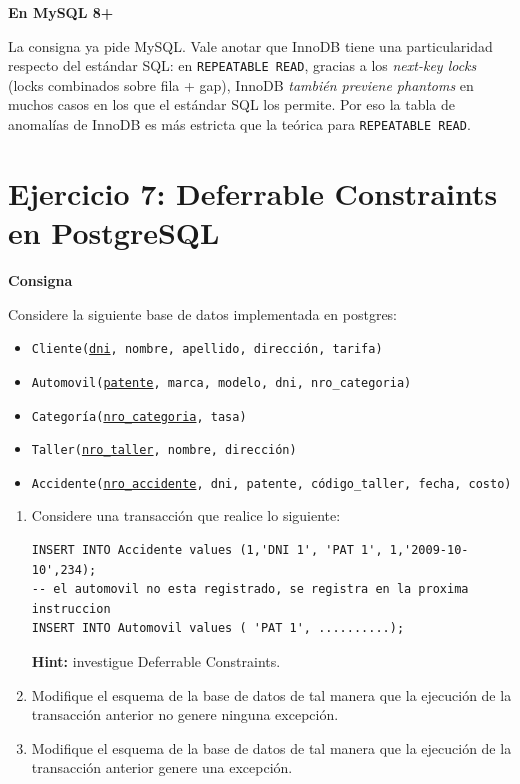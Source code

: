 \documentclass[11pt,a4paper]{article}
\newcommand{\itemcabecera}[1]{\noindent\textbf{#1}\par\medskip}
\newcommand{\bloqueConsigna}{\itemcabecera{Consigna}}
\newcommand{\bloqueMySQL}{\itemcabecera{En MySQL 8+}}
\begin{document}
\bloqueMySQL

La consigna ya pide MySQL. Vale anotar que InnoDB tiene una particularidad respecto del estándar SQL: en \texttt{REPEATABLE READ}, gracias a los \emph{next-key locks} (locks combinados sobre fila + gap), InnoDB \emph{también previene phantoms} en muchos casos en los que el estándar SQL los permite. Por eso la tabla de anomalías de InnoDB es más estricta que la teórica para \texttt{REPEATABLE READ}.

\section{Ejercicio 7: Deferrable Constraints en PostgreSQL}

\bloqueConsigna

Considere la siguiente base de datos implementada en postgres:

\begin{itemize}
    \item \texttt{Cliente(\underline{dni}, nombre, apellido, dirección, tarifa)}
    \item \texttt{Automovil(\underline{patente}, marca, modelo, dni, nro\_categoria)}
    \item \texttt{Categoría(\underline{nro\_categoria}, tasa)}
    \item \texttt{Taller(\underline{nro\_taller}, nombre, dirección)}
    \item \texttt{Accidente(\underline{nro\_accidente}, dni, patente, código\_taller, fecha, costo)}
\end{itemize}

\begin{enumerate}[label=\alph*),leftmargin=*]
    \item Considere una transacción que realice lo siguiente:
\begin{lstlisting}
INSERT INTO Accidente values (1,'DNI 1', 'PAT 1', 1,'2009-10-10',234);
-- el automovil no esta registrado, se registra en la proxima instruccion
INSERT INTO Automovil values ( 'PAT 1', ..........);
\end{lstlisting}
    \textbf{Hint:} investigue Deferrable Constraints.
    \item Modifique el esquema de la base de datos de tal manera que la ejecución de la transacción anterior no genere ninguna excepción.
    \item Modifique el esquema de la base de datos de tal manera que la ejecución de la transacción anterior genere una excepción.
\end{enumerate}
\end{document}
